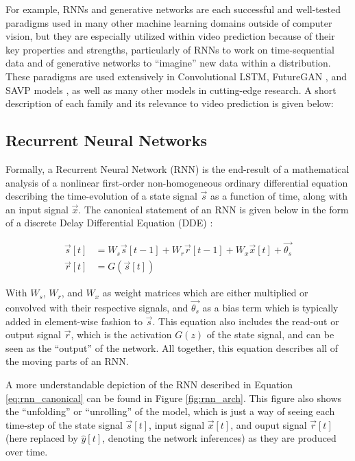 \documentclass{scrartcl}
\begin{document}
For example, RNNs and generative networks are each successful and well-tested
paradigms used in many other machine learning domains outside of computer
vision, but they are especially utilized within video prediction because of
their key properties and strengths, particularly of RNNs to work on
time-sequential data and of generative networks to ``imagine'' new data within
a distribution. These paradigms are used extensively in Convolutional LSTM,
FutureGAN \cite{futuregan}, and SAVP models \cite{savp}, as well as many other
models in cutting-edge research. A short description of each family and its
relevance to video prediction is given below:

\subsection{Recurrent Neural Networks}
\label{subsec:recurrent}

Formally, a Recurrent Neural Network (RNN) is the end-result of a mathematical
analysis of a nonlinear first-order non-homogeneous ordinary differential
equation describing the time-evolution of a state signal $\vec{s}$ as a
function of time, along with an input signal $\vec{x}$. The canonical statement
of an RNN is given below in the form of a discrete Delay Differential Equation
(DDE) \cite{rnn_and_lstm_fundamentals}:

\begin{equation}
	\begin{split}
		\vec{s} [t] & = W_s \vec{s} [t - 1] + W_r \vec{r} [t - 1] + W_x \vec{x} [t] + \vec{\theta_s} \\
		\vec{r} [t] & = G ( \vec{s} [t] )
	\end{split}
	\label{eq:rnn_canonical}
\end{equation}

With $W_s$, $W_r$, and $W_x$ as weight matrices which are either multiplied or
convolved with their respective signals, and $\vec{\theta_s}$ as a bias term
which is typically added in element-wise fashion to $\vec{s}$. This equation
also includes the read-out or output signal $\vec{r}$, which is the activation
$G(z)$ of the state signal, and can be seen as the ``output'' of the network.
All together, this equation describes all of the moving parts of an RNN.

A more understandable depiction of the RNN described in Equation
\ref{eq:rnn_canonical} can be found in Figure \ref{fig:rnn_arch}. This figure
also shows the ``unfolding'' or ``unrolling'' of the model, which is just a way
of seeing each time-step of the state signal $\vec{s} [t]$, input signal
$\vec{x} [t]$, and ouput signal $\vec{r} [t]$ (here replaced by $\hat{y} [t]$,
denoting the network inferences) as they are produced over time.
\end{document}
